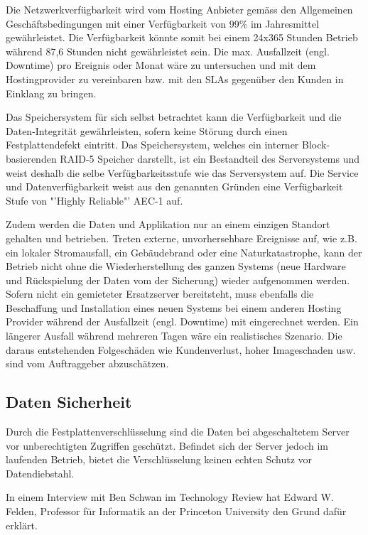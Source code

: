 Die Netzwerkverfügbarkeit wird vom Hosting Anbieter gemäss den Allgemeinen Geschäftsbedingungen \cite{Ag2009} mit einer Verfügbarkeit von 99\% im Jahresmittel gewährleistet. Die Verfügbarkeit könnte somit bei einem 24x365 Stunden Betrieb während 87,6 Stunden nicht gewährleistet sein. Die max. Ausfallzeit (engl. Downtime) pro Ereignis oder Monat wäre zu untersuchen und mit dem Hostingprovider zu vereinbaren bzw. mit den SLAs gegenüber den Kunden in Einklang zu bringen.

Das Speichersystem für sich selbst betrachtet kann die Verfügbarkeit und die Daten-Integrität gewährleisten, sofern keine Störung durch einen Festplattendefekt eintritt. Das Speichersystem, welches ein interner Block-basierenden RAID-5 Speicher darstellt, ist ein Bestandteil des Serversystems und weist deshalb die selbe Verfügbarkeitsstufe wie das Serversystem auf. Die Service und Datenverfügbarkeit weist aus den genannten Gründen eine Verfügbarkeit Stufe von "'Highly Reliable"' AEC-1 auf.

Zudem werden die Daten und Applikation nur an einem einzigen Standort gehalten und betrieben. Treten externe, unvorhersehbare Ereignisse auf, wie z.B. ein lokaler Stromausfall, ein Gebäudebrand oder eine Naturkatastrophe, kann der Betrieb nicht ohne die Wiederherstellung des ganzen Systems (neue Hardware und Rückspielung der Daten vom der Sicherung) wieder aufgenommen werden. Sofern nicht ein gemieteter Ersatzserver bereitsteht, muss ebenfalls die Beschaffung und Installation eines neuen Systems bei einem anderen Hosting Provider während der Ausfallzeit (engl. Downtime) mit eingerechnet werden. Ein längerer Ausfall während mehreren Tagen wäre ein realistisches Szenario. Die daraus entstehenden Folgeschäden wie Kundenverlust, hoher Imageschaden usw. sind vom Auftraggeber abzuschätzen.

\subsection{Daten Sicherheit}
Durch die Festplattenverschlüsselung sind die Daten bei abgeschaltetem Server vor unberechtigten Zugriffen geschützt. Befindet sich der Server jedoch im laufenden Betrieb, bietet die Verschlüsselung keinen echten Schutz vor Datendiebstahl. 

In einem Interview mit Ben Schwan im Technology Review hat Edward W. Felden, Professor für Informatik an der Princeton University den Grund dafür erklärt. 

